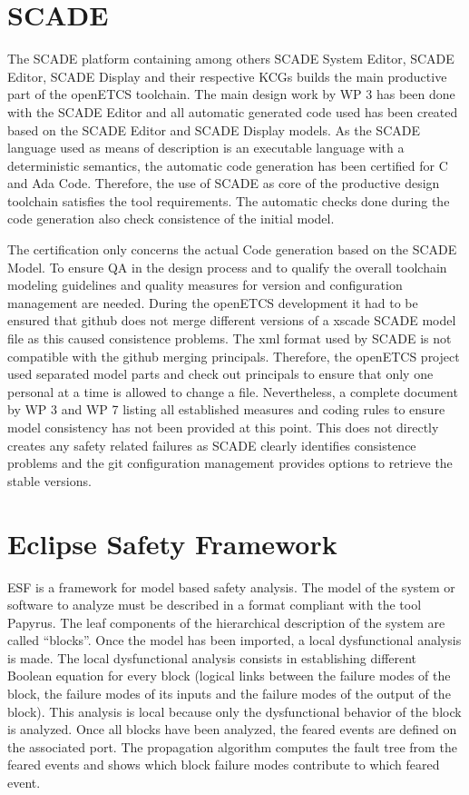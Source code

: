 \documentclass{template/openetcs_report}
\begin{document}
\section{SCADE}

The SCADE platform containing among others SCADE System Editor, SCADE Editor, SCADE Display and their respective KCGs builds the main productive part of the openETCS toolchain. The main design work by WP 3 has been done with the SCADE Editor and all automatic generated code used has been created based on the SCADE Editor and SCADE Display models. As the SCADE language used as means of description is  an executable language with a deterministic semantics, the automatic code generation has been certified for C and Ada Code. Therefore, the use of SCADE as core of the productive design toolchain satisfies the tool requirements. The automatic checks done during the code generation also check consistence of the initial model.

The certification only concerns the actual Code generation based on the SCADE Model. To ensure QA in the design process and to qualify the overall toolchain modeling guidelines and quality measures for version and configuration management are needed. During the openETCS development it had to be ensured that github does not merge different versions of a xscade SCADE model file as this caused consistence problems. The xml format used by SCADE is not compatible with the github merging principals. Therefore, the openETCS project used separated model parts and check out principals to ensure that only one personal at a time is allowed to change a file. Nevertheless, a complete document by WP 3 and WP 7 listing all established measures and coding rules to ensure model consistency has not been provided at this point. This does not directly creates any safety related failures as SCADE clearly identifies consistence problems and the git configuration management provides options to retrieve the stable versions.


\section{Eclipse Safety Framework}

ESF is a framework for model based safety analysis. The model of the system or software to analyze must be described in a format compliant with the tool Papyrus. The leaf components of the hierarchical description of the system are called “blocks”. Once the model has been imported, a local dysfunctional analysis is made. The local dysfunctional analysis consists in establishing different Boolean equation for every block (logical links between the failure modes of the block, the failure modes of its inputs and the failure modes of the output of the block). This analysis is local because only the dysfunctional behavior of the block is analyzed. Once all blocks have been analyzed, the feared events are defined on the associated port. The propagation algorithm computes the fault tree from the feared events and shows which block failure modes contribute to which feared event.
\end{document}
